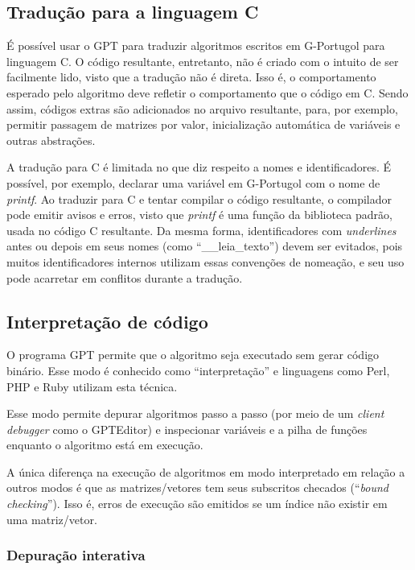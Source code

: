 \documentclass[a4paper,11pt]{report}
\begin{document}
\subsection{Tradução para a linguagem C}

É possível usar o GPT para traduzir algoritmos escritos em G-Portugol para
linguagem C. O código resultante, entretanto, não é criado com o intuito de ser
facilmente lido, visto que a tradução não é direta. Isso é, o comportamento
esperado pelo algoritmo deve refletir o comportamento que o código em C. Sendo
assim, códigos extras são adicionados no arquivo resultante, para, por exemplo,
permitir passagem de matrizes por valor, inicialização automática de variáveis e
outras abstrações.

A tradução para C é limitada no que diz respeito a nomes e identificadores. É
possível, por exemplo, declarar uma variável em G-Portugol com o nome de
\textit{printf}. Ao traduzir para C e tentar compilar o código resultante, o
compilador pode emitir avisos e erros, visto que \textit{printf} é uma função da
biblioteca padrão, usada no código C resultante. Da mesma forma, identificadores
com \textit{underlines} antes ou depois em seus nomes (como ``\_\_leia\_texto'')
devem ser evitados, pois muitos identificadores internos utilizam essas
convenções de nomeação, e seu uso pode acarretar em conflitos durante a
tradução.

\subsection{Interpretação de código}

O programa GPT permite que o algoritmo seja executado sem gerar código binário.
Esse modo é conhecido como ``interpretação'' e linguagens como Perl, PHP e Ruby
utilizam esta técnica.

Esse modo permite depurar algoritmos passo a passo (por meio de um
\textit{client debugger} como o GPTEditor) e inspecionar variáveis e a pilha de
funções enquanto o algoritmo está em execução.

A única diferença na execução de algoritmos em modo interpretado em relação a
outros modos é que as matrizes/vetores tem seus subscritos checados
(``\textit{bound checking}''). Isso é, erros de execução são emitidos se um
índice não existir em uma matriz/vetor.

\subsubsection{Depuração interativa}
\end{document}

